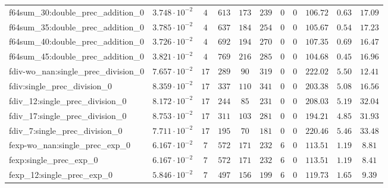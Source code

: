\begin{tabular}{|l|c|c|c|c|c|c|c|c|c|c|}
f64sum\_30:double\_prec\_addition\_0           & $ 3.748 \cdot 10^{-2} $ & $ 4      $ & $ 613    $ & $ 173   $ & $ 239   $ & $ 0   $ & $ 0 $ & $ 106.72      $ & $ 0.63    $ & $ 17.09   $ \\
f64sum\_35:double\_prec\_addition\_0           & $ 3.785 \cdot 10^{-2} $ & $ 4      $ & $ 637    $ & $ 184   $ & $ 254   $ & $ 0   $ & $ 0 $ & $ 105.67      $ & $ 0.54    $ & $ 17.23   $ \\
f64sum\_40:double\_prec\_addition\_0           & $ 3.726 \cdot 10^{-2} $ & $ 4      $ & $ 692    $ & $ 194   $ & $ 270   $ & $ 0   $ & $ 0 $ & $ 107.35      $ & $ 0.69    $ & $ 16.47   $ \\
f64sum\_45:double\_prec\_addition\_0           & $ 3.821 \cdot 10^{-2} $ & $ 4      $ & $ 769    $ & $ 216   $ & $ 285   $ & $ 0   $ & $ 0 $ & $ 104.68      $ & $ 0.45    $ & $ 16.96   $ \\
fdiv-wo\_nan:single\_prec\_division\_0         & $ 7.657 \cdot 10^{-2} $ & $ 17     $ & $ 289    $ & $ 90    $ & $ 319   $ & $ 0   $ & $ 0 $ & $ 222.02      $ & $ 5.50    $ & $ 12.41   $ \\
fdiv:single\_prec\_division\_0                 & $ 8.359 \cdot 10^{-2} $ & $ 17     $ & $ 337    $ & $ 110   $ & $ 341   $ & $ 0   $ & $ 0 $ & $ 203.38      $ & $ 5.08    $ & $ 16.56   $ \\
fdiv\_12:single\_prec\_division\_0             & $ 8.172 \cdot 10^{-2} $ & $ 17     $ & $ 244    $ & $ 85    $ & $ 231   $ & $ 0   $ & $ 0 $ & $ 208.03      $ & $ 5.19    $ & $ 32.04   $ \\
fdiv\_17:single\_prec\_division\_0             & $ 8.753 \cdot 10^{-2} $ & $ 17     $ & $ 311    $ & $ 103   $ & $ 281   $ & $ 0   $ & $ 0 $ & $ 194.21      $ & $ 4.85    $ & $ 31.93   $ \\
fdiv\_7:single\_prec\_division\_0              & $ 7.711 \cdot 10^{-2} $ & $ 17     $ & $ 195    $ & $ 70    $ & $ 181   $ & $ 0   $ & $ 0 $ & $ 220.46      $ & $ 5.46    $ & $ 33.48   $ \\
fexp-wo\_nan:single\_prec\_exp\_0              & $ 6.167 \cdot 10^{-2} $ & $ 7      $ & $ 572    $ & $ 171   $ & $ 232   $ & $ 6   $ & $ 0 $ & $ 113.51      $ & $ 1.19    $ & $ 8.81    $ \\
fexp:single\_prec\_exp\_0                      & $ 6.167 \cdot 10^{-2} $ & $ 7      $ & $ 572    $ & $ 171   $ & $ 232   $ & $ 6   $ & $ 0 $ & $ 113.51      $ & $ 1.19    $ & $ 8.41    $ \\
fexp\_12:single\_prec\_exp\_0                  & $ 5.846 \cdot 10^{-2} $ & $ 7      $ & $ 497    $ & $ 156   $ & $ 199   $ & $ 6   $ & $ 0 $ & $ 119.73      $ & $ 1.65    $ & $ 9.39    $ \\

\end{tabular}
